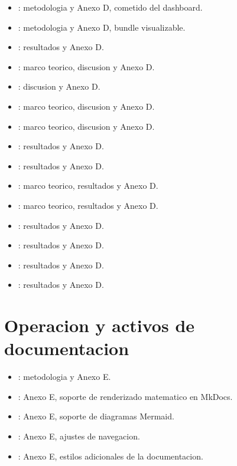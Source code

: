 \begin{itemize}
  \item {}: metodologia y Anexo D, cometido del dashboard.
  \item {}: metodologia y Anexo D, bundle visualizable.
  \item {}: resultados y Anexo D.
  \item {}: marco teorico, discusion y Anexo D.
  \item {}: discusion y Anexo D.
  \item {}: marco teorico, discusion y Anexo D.
  \item {}: marco teorico, discusion y Anexo D.
  \item {}: resultados y Anexo D.
  \item {}: resultados y Anexo D.
  \item {}: marco teorico, resultados y Anexo D.
  \item {}: marco teorico, resultados y Anexo D.
  \item {}: resultados y Anexo D.
  \item {}: resultados y Anexo D.
  \item {}: resultados y Anexo D.
  \item {}: resultados y Anexo D.
\end{itemize}

\section{Operacion y activos de documentacion}

\begin{itemize}
  \item {}: metodologia y Anexo E.
  \item {}: Anexo E, soporte de renderizado matematico en MkDocs.
  \item {}: Anexo E, soporte de diagramas Mermaid.
  \item {}: Anexo E, ajustes de navegacion.
  \item {}: Anexo E, estilos adicionales de la documentacion.
\end{itemize}
